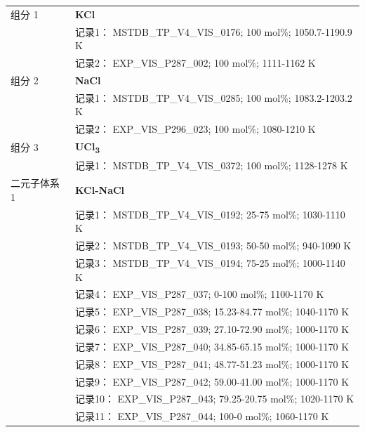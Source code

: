 \documentclass[12pt]{article}
\begin{document}
{\begin{longtable}[]{@{}
  >{\raggedright\arraybackslash}p{}
  >{\raggedright\arraybackslash}p{}@{}}
组分 1  & \textbf{KCl} \\
 & 记录1： MSTDB\_TP\_V4\_VIS\_0176; 100 mol\%; 1050.7-1190.9 K \\
 & 记录2： EXP\_VIS\_P287\_002; 100 mol\%; 1111-1162 K  \\

组分 2  & \textbf{NaCl} \\
 & 记录1： MSTDB\_TP\_V4\_VIS\_0285; 100 mol\%; 1083.2-1203.2 K \\
 & 记录2： EXP\_VIS\_P296\_023; 100 mol\%; 1080-1210 K  \\

组分 3  & \textbf{UCl\textsubscript{3}} \\
 & 记录1： MSTDB\_TP\_V4\_VIS\_0372; 100 mol\%; 1128-1278 K  \\

二元子体系 1  & \textbf{KCl-NaCl} \\
 & 记录1： MSTDB\_TP\_V4\_VIS\_0192; 25-75 mol\%; 1030-1110 K \\
 & 记录2： MSTDB\_TP\_V4\_VIS\_0193; 50-50 mol\%; 940-1090 K \\
 & 记录3： MSTDB\_TP\_V4\_VIS\_0194; 75-25 mol\%; 1000-1140 K \\
 & 记录4： EXP\_VIS\_P287\_037; 0-100 mol\%; 1100-1170 K \\
 & 记录5： EXP\_VIS\_P287\_038; 15.23-84.77 mol\%; 1040-1170 K \\
 & 记录6： EXP\_VIS\_P287\_039; 27.10-72.90 mol\%; 1000-1170 K \\
 & 记录7： EXP\_VIS\_P287\_040; 34.85-65.15 mol\%; 1000-1170 K \\
 & 记录8： EXP\_VIS\_P287\_041; 48.77-51.23 mol\%; 1000-1170 K \\
 & 记录9： EXP\_VIS\_P287\_042; 59.00-41.00 mol\%; 1000-1170 K \\
 & 记录10： EXP\_VIS\_P287\_043; 79.25-20.75 mol\%; 1020-1170 K \\
 & 记录11： EXP\_VIS\_P287\_044; 100-0 mol\%; 1060-1170 K  \\


\end{longtable}}
\end{document}

